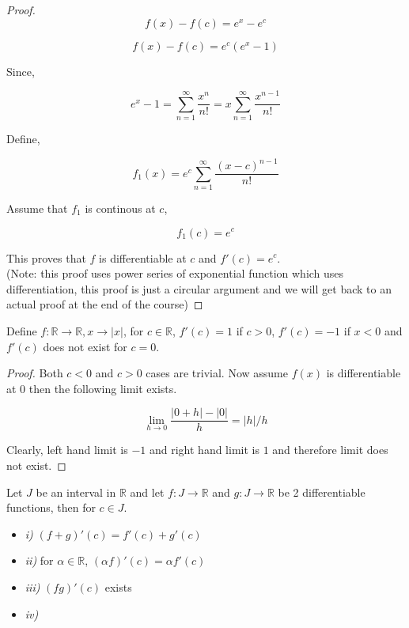 \documentclass[11pt,a4paper]{colorart}
\def\l{\left}
\def\r{\right}
\def\R{\mathbb{R}}
\def\a{\alpha}
\def\ra{\rightarrow}
\begin{document}
\begin{proof}
	
	\[ f(x) - f(c) = e^x - e^c \]

	\[ f(x) - f(c) = e^c \l( e^x - 1 \r) \]

	Since, 
	
	\[ e^x -1 = \sum_{n=1}^{\infty} \frac{ x^n }{ n! } = x \sum_{n=1}^{\infty} \frac{ x^{n-1} }{ n! } \]

	Define,

	\[ f_1(x) = e^c \sum_{n=1}^{\infty} \frac{ (x-c)^{n-1} }{ n! } \]

	Assume that $f_1$ is continous at $c$,

	\[ f_1(c) = e^c \]

	This proves that $f$ is differentiable at $c$ and $f'(c) = e^c$.\\

	(Note: this proof uses power series of exponential function which uses differentiation, this proof is just a circular argument and we will get back to an actual proof at the end of the course)

\end{proof}

\begin{example}
	Define $f: \R \ra \R, x \ra |x|$, for $c \in \R$, $f'(c) = 1$ if $c>0$, $f'(c) = -1$ if $x<0$ and $f'(c)$ does not exist for $c=0$.
\end{example}

\begin{proof}
	Both $c<0$ and $c>0$ cases are trivial. Now assume $f(x)$ is differentiable at 0 then the following limit exists.
	
	\[ \lim_{ h \to 0 } \frac{ |0+h| -|0| }{ h } = |h|/h \]
	
	Clearly, left hand limit is $-1$ and right hand limit is $1$ and therefore limit does not exist.

\end{proof}
	
\begin{theorem}
	Let $J$ be an interval in $\R$ and let $f:J \ra \R$ and $g:J \ra \R$ be 2 differentiable functions, then for $c \in J$.
	\begin{itemize}
		\item \textit{i)} $(f+g)'(c) = f'(c) + g'(c)$
		\item \textit{ii)} for $\a \in \R$, $(\a f)'(c) = \a f'(c)$
		\item \textit{iii)} $(fg)'(c)$ exists
		\item \textit{iv)}
	\end{itemize}
\end{theorem}
\end{document}
